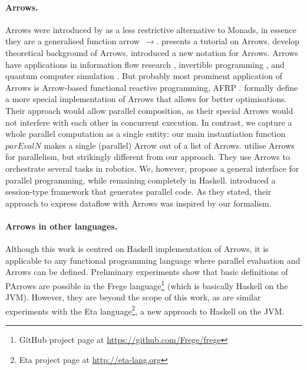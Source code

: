 \documentclass{jfp1}
\newcommand{\Varid}[1]{\mathit{#1}}
\renewcommand{\cite}[1]{\citep{#1}}
\begin{document}
\paragraph{Arrows.}
Arrows were introduced by \citet{HughesArrows} as a less restrictive alternative to Monads, in essence they are a generalised function arrow~\ensuremath{\to }. \citet{Hughes2005} presents a tutorial on Arrows. \citet{jacobs_heunen_hasuo_2009,LINDLEY201197,ATKEY201119} develop theoretical background of Arrows. \citet{Paterson:2001:NNA:507669.507664} introduced a new notation for Arrows. Arrows have applications in information flow research \cite{1648705,LI20101974,Russo:2008:LLI:1411286.1411289}, invertible programming \cite{Alimarine:2005:BAA:1088348.1088357}, and quantum computer simulation \cite{vizzotto_altenkirch_sabry_2006}. But probably most prominent application of Arrows is Arrow-based functional reactive programming, AFRP \cite{Nilsson:2002:FRP:581690.581695,Hudak2003,Czaplicki:2013:AFR:2499370.2462161}.
\citet{Liu:2009:CCA:1631687.1596559} formally define a more special
implementation of Arrows that allows for better optimisations.
Their approach would allow parallel composition, as their special Arrows would not interfere with each other in concurrent execution. In contrast, we capture a whole parallel computation as a single entity: our main instantiation function \ensuremath{\Varid{parEvalN}} makes a single (parallel) Arrow out of a list of Arrows. \citet{Huang2007} utilise Arrows for parallelism, but strikingly different from our approach. They use Arrows to orchestrate several tasks in robotics. We, however, propose a general interface for parallel programming, while remaining completely in Haskell.
\citet{zhang_session_2019} introduced a session-type framework that generates parallel code. As they stated, their approach to express dataflow with Arrows was inspired by our formalism.

\paragraph{Arrows in other languages.}
Although this work is centred on Haskell implementation of Arrows, it is applicable to any functional programming language where parallel evaluation and Arrows can be defined. Preliminary experiments show that basic definitions of PArrows are possible in the Frege language\footnote{GitHub project page at \url{https://github.com/Frege/frege}} (which is basically Haskell on the JVM). However, they are beyond the scope of this work, as are similar experiments with the Eta language\footnote{Eta project page at \url{http://eta-lang.org}}, 
a new approach to Haskell on the JVM.
\end{document}
